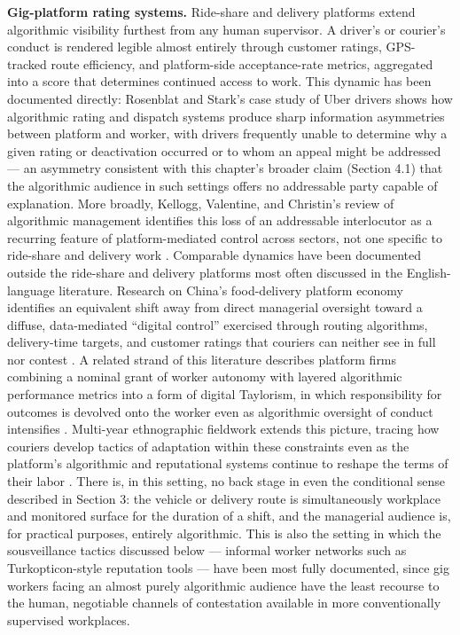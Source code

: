 \documentclass[10pt]{article}
\begin{document}
\textbf{Gig-platform rating systems.} Ride-share and delivery platforms extend algorithmic visibility furthest from any human supervisor. A driver's or courier's conduct is rendered legible almost entirely through customer ratings, GPS-tracked route efficiency, and platform-side acceptance-rate metrics, aggregated into a score that determines continued access to work. This dynamic has been documented directly: Rosenblat and Stark's case study of Uber drivers shows how algorithmic rating and dispatch systems produce sharp information asymmetries between platform and worker, with drivers frequently unable to determine why a given rating or deactivation occurred or to whom an appeal might be addressed \cite{rosenblat2016} --- an asymmetry consistent with this chapter's broader claim (Section 4.1) that the algorithmic audience in such settings offers no addressable party capable of explanation. More broadly, Kellogg, Valentine, and Christin's review of algorithmic management identifies this loss of an addressable interlocutor as a recurring feature of platform-mediated control across sectors, not one specific to ride-share and delivery work \cite{kellogg2020}. Comparable dynamics have been documented outside the ride-share and delivery platforms most often discussed in the English-language literature. Research on China's food-delivery platform economy identifies an equivalent shift away from direct managerial oversight toward a diffuse, data-mediated ``digital control'' exercised through routing algorithms, delivery-time targets, and customer ratings that couriers can neither see in full nor contest \cite{chenlong2020}. A related strand of this literature describes platform firms combining a nominal grant of worker autonomy with layered algorithmic performance metrics into a form of digital Taylorism, in which responsibility for outcomes is devolved onto the worker even as algorithmic oversight of conduct intensifies \cite{chenhan2020}. Multi-year ethnographic fieldwork extends this picture, tracing how couriers develop tactics of adaptation within these constraints even as the platform's algorithmic and reputational systems continue to reshape the terms of their labor \cite{sunping2024}. There is, in this setting, no back stage in even the conditional sense described in Section 3: the vehicle or delivery route is simultaneously workplace and monitored surface for the duration of a shift, and the managerial audience is, for practical purposes, entirely algorithmic. This is also the setting in which the sousveillance tactics discussed below --- informal worker networks such as Turkopticon-style reputation tools --- have been most fully documented, since gig workers facing an almost purely algorithmic audience have the least recourse to the human, negotiable channels of contestation available in more conventionally supervised workplaces.
\end{document}
